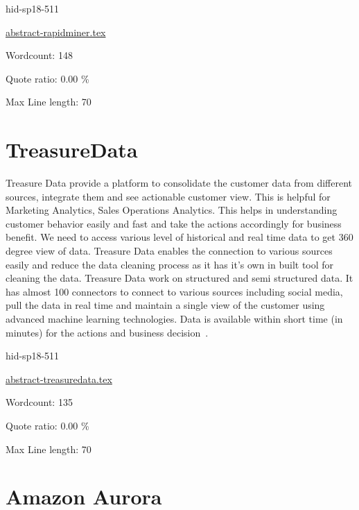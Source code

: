 \begin{IU}

hid-sp18-511

\href{https://github.com/cloudmesh-community/hid-sp18-511/blob/master//technology/abstract-rapidminer.tex}{abstract-rapidminer.tex}

 

Wordcount: 148


Quote ratio: 0.00 \%
 
Max Line length: 70
\end{IU}

\section{TreasureData}

Treasure Data provide a platform to consolidate the customer data from
different sources, integrate them and see actionable customer view.
This is helpful for Marketing Analytics, Sales Operations Analytics.
This helps in understanding customer behavior easily and fast and take
the actions accordingly for business benefit. We need to access
various level of historical and real time data to get 360 degree view
of data. Treasure Data enables the connection to various sources
easily and reduce the data cleaning process as it
has it's own in built tool for cleaning the data. Treasure Data work
on structured and semi structured data. It has almost 100 connectors
to connect to various sources including social media, pull the data in
real time and maintain a single view of the customer using advanced
machine learning technologies. Data is available within short time (in
minutes) for the actions and business
decision~\cite{hid-sp18-511-treasuredata}.


\begin{IU}

hid-sp18-511

\href{https://github.com/cloudmesh-community/hid-sp18-511/blob/master//technology/abstract-treasuredata.tex}{abstract-treasuredata.tex}

 

Wordcount: 135


Quote ratio: 0.00 \%
 
Max Line length: 70
\end{IU}

\section{Amazon Aurora}

